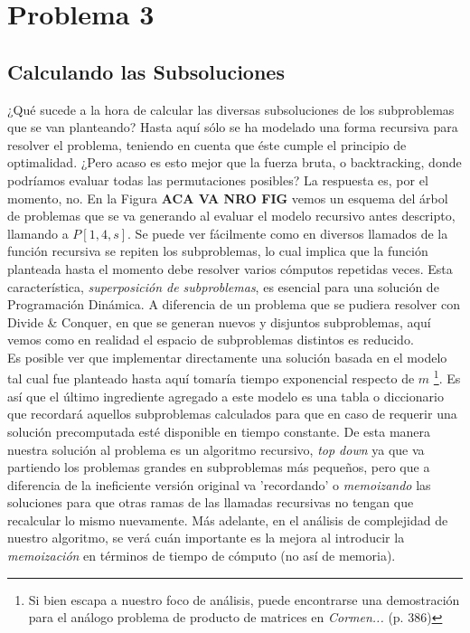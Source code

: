 \section{Problema 3}

\subsection{Calculando las Subsoluciones}

¿Qué sucede a la hora de calcular las diversas subsoluciones de los subproblemas que se van planteando? Hasta aquí sólo se ha modelado una forma recursiva para resolver el problema, teniendo en cuenta que éste cumple el principio de optimalidad. ¿Pero acaso es esto mejor que la fuerza bruta, o backtracking, donde podríamos evaluar todas las permutaciones posibles? La respuesta es, por el momento, no. En la Figura \textbf{ACA VA NRO FIG} vemos un esquema del árbol de problemas que se va generando al evaluar el modelo recursivo antes descripto, llamando a $P[1,4,s]$. Se puede ver fácilmente como en diversos llamados de la función recursiva se repiten los subproblemas, lo cual implica que la función planteada hasta el momento debe resolver varios cómputos repetidas veces. Esta característica, \textsl{superposición de subproblemas}, es esencial para una solución de Programación Dinámica. A diferencia de un problema que se pudiera resolver con Divide \& Conquer, en que se generan nuevos y disjuntos subproblemas, aquí vemos como en realidad el espacio de subproblemas distintos es reducido.\\
\indent Es posible ver que implementar directamente una solución basada en el modelo tal cual fue planteado hasta aquí tomaría tiempo exponencial respecto de $m$ \footnote{Si bien escapa a nuestro foco de análisis, puede encontrarse una demostración para el análogo problema de producto de matrices en \textit{Cormen...} (p. 386)}. Es así que el último ingrediente agregado a este modelo es una tabla o diccionario que recordará aquellos subproblemas calculados para que en caso de requerir una solución precomputada esté disponible en tiempo constante. De esta manera nuestra solución al problema es un algoritmo recursivo, \textsl{top down} ya que va partiendo los problemas grandes en subproblemas más pequeños, pero que a diferencia de la ineficiente versión original va 'recordando' o \textsl{memoizando} las soluciones para que otras ramas de las llamadas recursivas no tengan que recalcular lo mismo nuevamente. Más adelante, en el análisis de complejidad de nuestro algoritmo, se verá cuán importante es la mejora al introducir la \textsl{memoización} en términos de tiempo de cómputo (no así de memoria).

